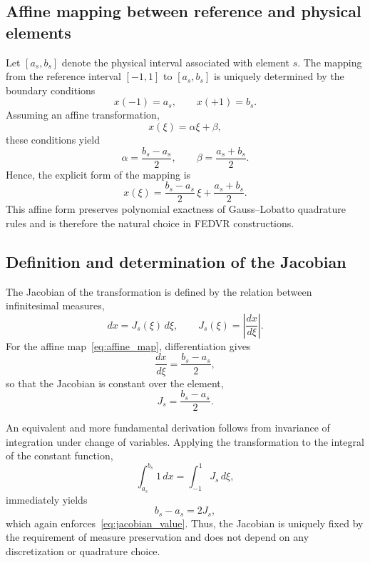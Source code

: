 \subsection{Affine mapping between reference and physical elements}

Let $[a_s,b_s]$ denote the physical interval associated with element $s$. The mapping from the reference interval $[-1,1]$ to $[a_s,b_s]$ is uniquely determined by the boundary conditions
\begin{equation}
x(-1)=a_s, \qquad x(+1)=b_s.
\end{equation}
Assuming an affine transformation,
\begin{equation}
x(\xi)=\alpha \xi + \beta,
\end{equation}
these conditions yield
\begin{equation}
\alpha=\frac{b_s-a_s}{2}, \qquad \beta=\frac{a_s+b_s}{2}.
\end{equation}
Hence, the explicit form of the mapping is
\begin{equation}
\label{eq:affine_map}
x(\xi)=\frac{b_s-a_s}{2}\,\xi + \frac{a_s+b_s}{2}.
\end{equation}
This affine form preserves polynomial exactness of Gauss--Lobatto quadrature rules and is therefore the natural choice in FEDVR constructions.

\subsection{Definition and determination of the Jacobian}

The Jacobian of the transformation is defined by the relation between infinitesimal measures,
\begin{equation}
dx = J_s(\xi)\, d\xi,
\qquad
J_s(\xi)=\left|\frac{dx}{d\xi}\right|.
\end{equation}
For the affine map~\eqref{eq:affine_map}, differentiation gives
\begin{equation}
\frac{dx}{d\xi}=\frac{b_s-a_s}{2},
\end{equation}
so that the Jacobian is constant over the element,
\begin{equation}
\label{eq:jacobian_value}
J_s=\frac{b_s-a_s}{2}.
\end{equation}

An equivalent and more fundamental derivation follows from invariance of integration under change of variables. Applying the transformation to the integral of the constant function,
\begin{equation}
\int_{a_s}^{b_s} 1\,dx
=
\int_{-1}^{1} J_s\, d\xi,
\end{equation}
immediately yields
\begin{equation}
b_s-a_s = 2J_s,
\end{equation}
which again enforces~\eqref{eq:jacobian_value}. Thus, the Jacobian is uniquely fixed by the requirement of measure preservation and does not depend on any discretization or quadrature choice.

